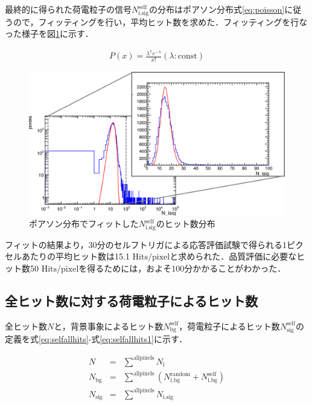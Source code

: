 最終的に得られた荷電粒子の信号$N_{\mathrm{i.sig}}^{\mathrm{self}}$の分布はポアソン分布式\ref{eq:poisson}に従うので，フィッティングを行い，平均ヒット数を求めた．フィッティングを行なった様子を図\ref{fig:selffit}に示す．

\begin{eqnarray}
  \label{eq:poisson}
  P(x) = \frac{\lambda^x e^{-\lambda}}{x!} (\lambda:\mathrm{const})
\end{eqnarray}

\begin{figure}[h]
  \centering
  \includegraphics[width=15cm]{./figure/selffit.png}
  \caption{ポアソン分布でフィットした$N_{\mathrm{i.sig}}^{\mathrm{self}}$のヒット数分布}
  \label{fig:selffit}
\end{figure}

フィットの結果より，30分のセルフトリガによる応答評価試験で得られる1ピクセルあたりの平均ヒット数は15.1 $\mathrm{Hits/pixel}$と求められた．品質評価に必要なヒット数50 $\mathrm{Hits/pixel}$を得るためには，およそ100分かかることがわかった．

\subsection*{全ヒット数に対する荷電粒子によるヒット数}
全ヒット数$N$と，背景事象によるヒット数$N_{\mathrm{bg}}^{\mathrm{self}}$，荷電粒子によるヒット数$N_{\mathrm{sig}}^{\mathrm{self}}$の定義を式\ref{eq:selfallhits}-式\ref{eq:selfallhits1}に示す．

\begin{eqnarray}
  \label{eq:selfallhits}
  N &=& \sum^{\mathrm{allpixels}} N_{\mathrm{i}} \\
  N_{\mathrm{bg}} &=& \sum^{\mathrm{allpixels}} \left(N_{\mathrm{i.bg}}^{\mathrm{random}} + N_{\mathrm{i.bg}}^{\mathrm{self}} \right) \\
  \label{eq:selfallhits1}
  N_{\mathrm{sig}} &=& \sum^{\mathrm{allpixels}} N_{\mathrm{i.sig}}
\end{eqnarray}

